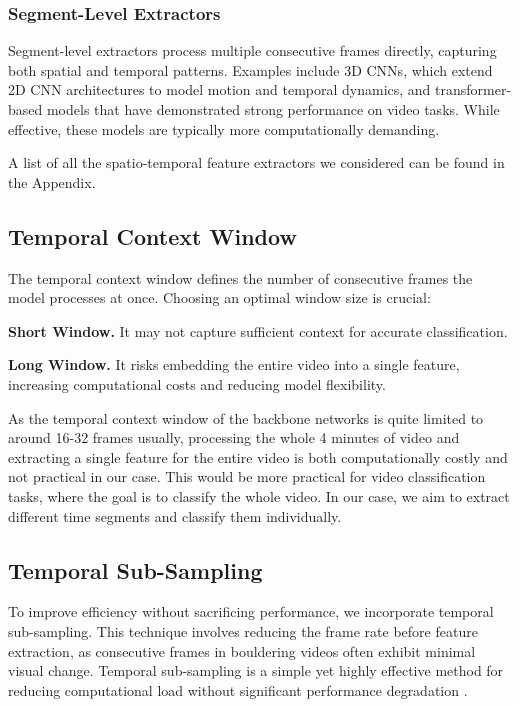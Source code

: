 \subsubsection{Segment-Level Extractors}
Segment-level extractors process multiple consecutive frames directly, capturing both spatial and temporal patterns. Examples include 3D CNNs, which extend 2D CNN architectures to model motion and temporal dynamics, and transformer-based models that have demonstrated strong performance on video tasks. While effective, these models are typically more computationally demanding.

A list of all the spatio-temporal feature extractors we considered can be found in the Appendix.

\subsection{Temporal Context Window}
The temporal context window defines the number of consecutive frames the model processes at once. Choosing an optimal window size is crucial:

\noindent\textbf{\small{Short Window.}}
It may not capture sufficient context for accurate classification.

\noindent\textbf{\small{Long Window.}}
It risks embedding the entire video into a single feature, increasing computational costs and reducing model flexibility.

As the temporal context window of the backbone networks is quite limited to around 16-32 frames usually, processing the whole 4 minutes of video and extracting a single feature for the entire video is both computationally costly and not practical in our case. This would be more practical for video classification tasks, where the goal is to classify the whole video. In our case, we aim to extract different time segments and classify them individually.

\subsection{Temporal Sub-Sampling}
To improve efficiency without sacrificing performance, we incorporate temporal sub-sampling. This technique involves reducing the frame rate before feature extraction, as consecutive frames in bouldering videos often exhibit minimal visual change. Temporal sub-sampling is a simple yet highly effective method for reducing computational load without significant performance degradation \cite{impact-of-temporal-subsampling}.

